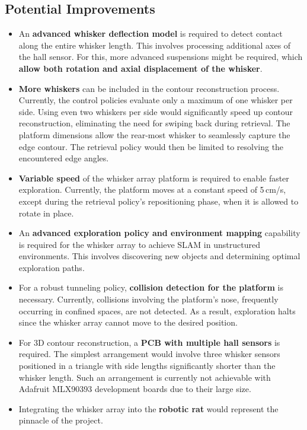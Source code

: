 \subsection{Potential Improvements}
\begin{itemize}
    \item An \textbf{advanced whisker deflection model} is required to detect contact along the entire whisker length.
    This involves processing additional axes of the hall sensor.
    For this, more advanced suspensions might be required, which \textbf{allow both rotation and axial displacement of the whisker}.

    \item \textbf{More whiskers} can be included in the contour reconstruction process.
    Currently, the control policies evaluate only a maximum of one whisker per side.
    Using even two whiskers per side would significantly speed up contour reconstruction, eliminating the need for swiping back during retrieval.
    The platform dimensions allow the rear-most whisker to seamlessly capture the edge contour.
    The retrieval policy would then be limited to resolving the encountered edge angles.

    \item \textbf{Variable speed} of the whisker array platform is required to enable faster exploration.
    Currently, the platform moves at a constant speed of 5\,cm/s, except during the retrieval policy’s repositioning phase, when it is allowed to rotate in place.

    \item An \textbf{advanced exploration policy and environment mapping} capability is required for the whisker array to achieve SLAM in unstructured environments.
    This involves discovering new objects and determining optimal exploration paths.

    \item For a robust tunneling policy, \textbf{collision detection for the platform} is necessary.
    Currently, collisions involving the platform’s nose, frequently occurring in confined spaces, are not detected.
    As a result, exploration halts since the whisker array cannot move to the desired position.

    \item For 3D contour reconstruction, a \textbf{PCB with multiple hall sensors} is required.
    The simplest arrangement would involve three whisker sensors positioned in a triangle with side lengths significantly shorter than the whisker length.
    Such an arrangement is currently not achievable with Adafruit MLX90393 development boards due to their large size.

    \item Integrating the whisker array into the \textbf{robotic rat} would represent the pinnacle of the project.
\end{itemize}
